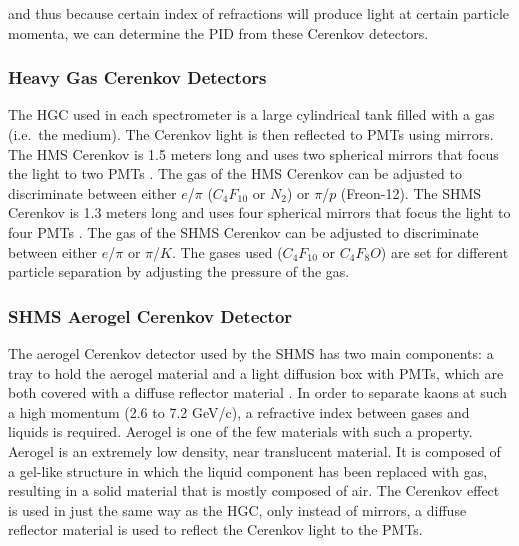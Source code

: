 \documentclass[
]{report}
\begin{document}
and thus because certain index of refractions will produce light at
certain particle momenta, we can determine the PID from these Cerenkov
detectors.

\hypertarget{heavy-gas-cerenkov-detectors}{%
\subsubsection{Heavy Gas Cerenkov
Detectors}\label{heavy-gas-cerenkov-detectors}}



The HGC used in each spectrometer is a large cylindrical tank filled
with a gas (i.e.~the medium). The Cerenkov light is then reflected to
PMTs using mirrors. The HMS Cerenkov is 1.5 meters long and uses two
spherical mirrors that focus the light to two PMTs
\cite{noauthor_threshold_1995}. The gas of the HMS Cerenkov can be
adjusted to discriminate between either \(e\)/\(\pi\) (\(C_4F_{10}\) or
\(N_2\)) or \(\pi\)/\(p\) (Freon-12). The SHMS Cerenkov is 1.3 meters
long and uses four spherical mirrors that focus the light to four PMTs
\cite{li_heavy_2012}. The gas of the SHMS Cerenkov can be adjusted to
discriminate between either \(e\)/\(\pi\) or \(\pi\)/\(K\). The gases
used (\(C_4F_{10}\) or \(C_4F_8O\)) are set for different particle
separation by adjusting the pressure of the gas.

\hypertarget{shms-aerogel-cerenkov-detector}{%
\subsubsection{SHMS Aerogel Cerenkov
Detector}\label{shms-aerogel-cerenkov-detector}}



The aerogel Cerenkov detector used by the SHMS has two main components:
a tray to hold the aerogel material and a light diffusion box with PMTs,
which are both covered with a diffuse reflector material
\cite{horn_aerogel_2017}. In order to separate kaons at such a high
momentum (2.6 to 7.2 GeV/c), a refractive index between gases and
liquids is required. Aerogel is one of the few materials with such a
property. Aerogel is an extremely low density, near translucent
material. It is composed of a gel-like structure in which the liquid
component has been replaced with gas, resulting in a solid material that
is mostly composed of air. The Cerenkov effect is used in just the same
way as the HGC, only instead of mirrors, a diffuse reflector material is
used to reflect the Cerenkov light to the PMTs.
\end{document}
